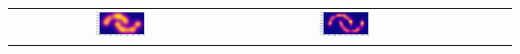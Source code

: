 \documentclass[14pt]{ffslides}
\begin{document}
{\begin{minipage}{0.35\textwidth}
\begin{center}
{\begin{tabular}{c|ccccc}
  \includegraphics[width=0.245\textwidth]{figures/online_gauss005_moons_density_max.pdf} &
  \includegraphics[width=0.245\textwidth]{figures/online_gauss001_moons_density_max.pdf}
\end{tabular}
}
\end{center}
\end{minipage}}

\resizebox{!}{0.75cm}{\textcolor{pdblue}{Experiments: benchmark datasets}}

\vskip 1cm
\end{document}
